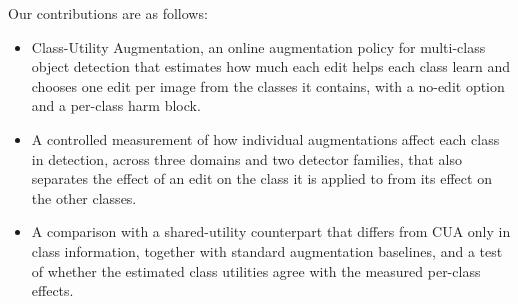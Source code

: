 \documentclass[conference]{IEEEtran}
\begin{document}
Our contributions are as follows:
\begin{itemize}
    \item Class-Utility Augmentation, an online augmentation policy for multi-class object detection that estimates how much each edit helps each class learn and chooses one edit per image from the classes it contains, with a no-edit option and a per-class harm block.
    \item A controlled measurement of how individual augmentations affect each class in detection, across three domains and two detector families, that also separates the effect of an edit on the class it is applied to from its effect on the other classes.
    \item A comparison with a shared-utility counterpart that differs from CUA only in class information, together with standard augmentation baselines, and a test of whether the estimated class utilities agree with the measured per-class effects.
\end{itemize}
\end{document}
